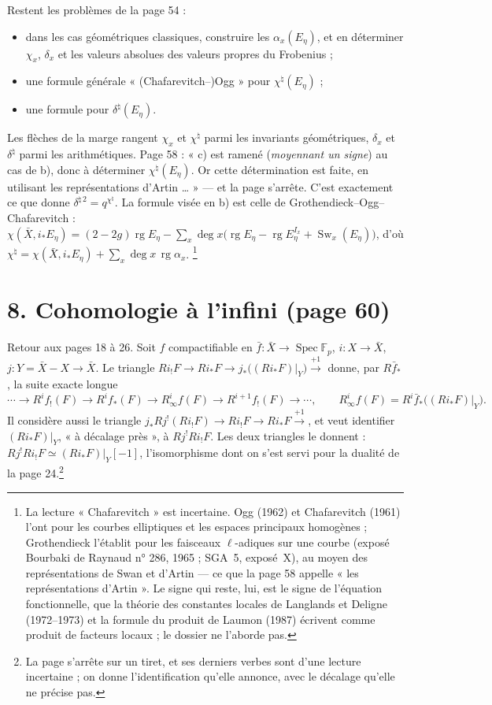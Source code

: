 \documentclass[11pt,a4paper]{article}
\begin{document}
Restent les problèmes de la page 54 :
\begin{itemize}
  \item[a)] dans les cas géométriques classiques, construire les
    $\alpha_x(E_\eta)$, et en déterminer $\chi_x$, $\delta_x$ et les valeurs
    absolues des valeurs propres du Frobenius ;
  \item[b)] une formule générale « (Chafarevitch--)Ogg » pour
    $\chi^{\natural}(E_\eta)$ ;
  \item[c)] une formule pour $\delta^{\natural}(E_\eta)$.
\end{itemize}
Les flèches de la marge rangent $\chi_x$ et $\chi^{\natural}$ parmi les
invariants géométriques, $\delta_x$ et $\delta^{\natural}$ parmi les
arithmétiques. Page 58 : « c) est ramené (\emph{moyennant un signe}) au cas de
b), donc à déterminer $\chi^{\natural}(E_\eta)$. Or cette détermination est
faite, en utilisant les représentations d'Artin … » --- et la page s'arrête.
C'est exactement ce que donne $\delta^{\natural\,2} = q^{\chi^{\natural}}$.
La formule visée en b) est celle de Grothendieck--Ogg--Chafarevitch :
$\chi(\bar X, i_{*}E_\eta) = (2 - 2g)\operatorname{rg}E_\eta - \sum_x \deg x
\bigl(\operatorname{rg}E_\eta - \operatorname{rg}E_\eta^{I_x} +
\operatorname{Sw}_x(E_\eta)\bigr)$, d'où
$\chi^{\natural} = \chi(\bar X, i_{*}E_\eta) + \sum_x \deg x\,\operatorname{rg}\alpha_x$.
\footnote{La lecture « Chafarevitch » est incertaine. Ogg (1962) et
Chafarevitch (1961) l'ont pour les courbes elliptiques et les espaces
principaux homogènes ; Grothendieck l'établit pour les faisceaux $\ell$-adiques
sur une courbe (exposé Bourbaki de Raynaud n° 286, 1965 ; SGA~5, exposé~X), au
moyen des représentations de Swan et d'Artin --- ce que la page 58 appelle
« les représentations d'Artin ». Le signe qui reste, lui, est le signe de
l'équation fonctionnelle, que la théorie des constantes locales de Langlands et
Deligne (1972--1973) et la formule du produit de Laumon (1987) écrivent comme
produit de facteurs locaux ; le dossier ne l'aborde pas.}

\section*{8. Cohomologie à l'infini (page 60)}

Retour aux pages 18 à 26. Soit $f$ compactifiable en
$\bar f : \bar X \to \operatorname{Spec}\mathbb{F}_p$, $i : X \to \bar X$,
$j : Y = \bar X - X \to \bar X$. Le triangle
$Ri_{!}F \to Ri_{*}F \to j_{*}\bigl((Ri_{*}F)|_Y\bigr) \xrightarrow{+1}$ donne,
par $R\bar f_{*}$, la suite exacte longue
\[
  \cdots \to R^i f_{!}(F) \to R^i f_{*}(F) \to R^i_\infty f(F) \to R^{i+1}f_{!}(F) \to \cdots,
  \qquad R^i_\infty f(F) = R^i\bar f_{*}\bigl((Ri_{*}F)|_Y\bigr).
\]
Il considère aussi le triangle
$j_{*}Rj^{!}(Ri_{!}F) \to Ri_{!}F \to Ri_{*}F \xrightarrow{+1}$, et veut
identifier $(Ri_{*}F)|_Y$, « à décalage près », à $Rj^{!}Ri_{!}F$. Les deux
triangles le donnent : $Rj^{!}Ri_{!}F \simeq (Ri_{*}F)|_Y[-1]$, l'isomorphisme
dont on s'est servi pour la dualité de la page 24.\footnote{La page s'arrête sur
un tiret, et ses derniers verbes sont d'une lecture incertaine ; on donne
l'identification qu'elle annonce, avec le décalage qu'elle ne précise pas.}
\end{document}
